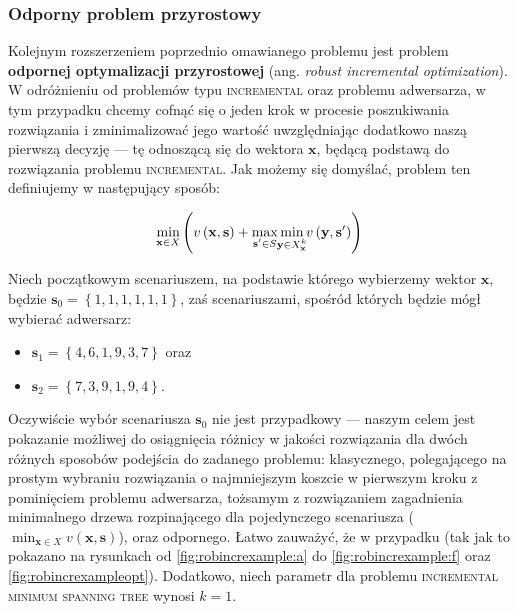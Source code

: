 \subsubsection{Odporny problem przyrostowy}

Kolejnym rozszerzeniem poprzednio omawianego problemu jest problem \textbf{odpornej optymalizacji przyrostowej} (ang. \textit{robust incremental optimization}). W odróżnieniu od problemów typu \textsc{incremental} oraz problemu adwersarza, w tym przypadku chcemy cofnąć się o jeden krok w procesie poszukiwania rozwiązania i zminimalizować jego wartość uwzględniając dodatkowo naszą pierwszą decyzję --- tę odnoszącą się do wektora $\textbf{x}$, będącą podstawą do rozwiązania problemu \textsc{incremental}. Jak możemy się domyślać, problem ten definiujemy w następujący sposób:

\begin{equation}\label{eq:rimstdef}
	\min_{\mathclap{\textbf{x} \in X}} \left( v \left( \textbf{x}, \textbf{s} \right) + \max_{\mathclap{\textbf{s}^{\prime} \in S}} \min_{\mathclap{\textbf{y} \in X^{k}_{\textbf{x}}}} v \left( \textbf{y}, \textbf{s}^{\prime} \right) \right)
\end{equation}

Niech początkowym scenariuszem, na podstawie którego wybierzemy wektor $\textbf{x}$, będzie $\textbf{s}_{0} = \left\{ 1, 1, 1, 1, 1, 1 \right\}$, zaś scenariuszami, spośród których będzie mógł wybierać adwersarz:
\begin{itemize}
	\item $\textbf{s}_{1} = \left\{ 4, 6, 1, 9, 3, 7 \right\}$ oraz
	\item $\textbf{s}_{2} = \left\{ 7, 3, 9, 1, 9, 4 \right\}$.
\end{itemize}
Oczywiście wybór scenariusza $\textbf{s}_{0}$ nie jest przypadkowy --- naszym celem jest pokazanie możliwej do osiągnięcia różnicy w jakości rozwiązania dla dwóch różnych sposobów podejścia do zadanego problemu: klasycznego, polegającego na prostym wybraniu rozwiązania o najmniejszym koszcie w pierwszym kroku z pominięciem problemu adwersarza, tożsamym z rozwiązaniem zagadnienia minimalnego drzewa rozpinającego dla pojedynczego scenariusza ($\min_{\textbf{x} \in X} v \left( \textbf{x}, \textbf{s} \right)$), oraz odpornego. Łatwo zauważyć, że w przypadku  (tak jak to pokazano na rysunkach od \ref{fig:robincrexample:a} do \ref{fig:robincrexample:f} oraz \ref{fig:robincrexampleopt}). Dodatkowo, niech parametr dla problemu \textsc{incremental minimum spanning tree} wynosi $k = 1$.


